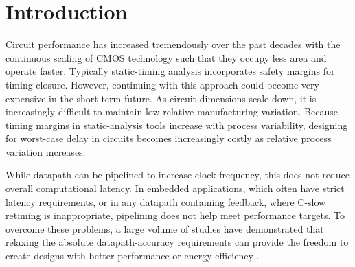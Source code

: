\documentclass{acm_proc_article-sp}
\begin{document}
\vspace{-1ex}
\vspace{-1ex}

\section{Introduction}
Circuit performance has increased tremendously over the past decades with the continuous scaling of CMOS technology such that they occupy less area and operate faster. Typically static-timing analysis incorporates safety margins for timing closure. However, continuing with this approach could become very expensive in the short term future. As circuit dimensions scale down, it is increasingly difficult to maintain low relative manufacturing-variation. Because timing margins in static-analysis tools increase with process variability, designing for worst-case delay in circuits becomes increasingly costly as relative process variation increases.\vspace{-1ex}

While datapath can be pipelined to increase clock frequency, this does not reduce overall computational latency. In  embedded applications, which often have strict latency requirements, or in any datapath containing feedback, where C-slow retiming is inappropriate, pipelining does not help meet performance targets. To overcome these problems, a large volume of studies have demonstrated that relaxing the absolute datapath-accuracy requirements can provide the freedom to create designs with better performance or energy efficiency \cite{Razor2004,Gupta2013TransCADICS,NonUniformScaling,Undersigned2x2multiplier}.\vspace{-1ex}
\end{document}
